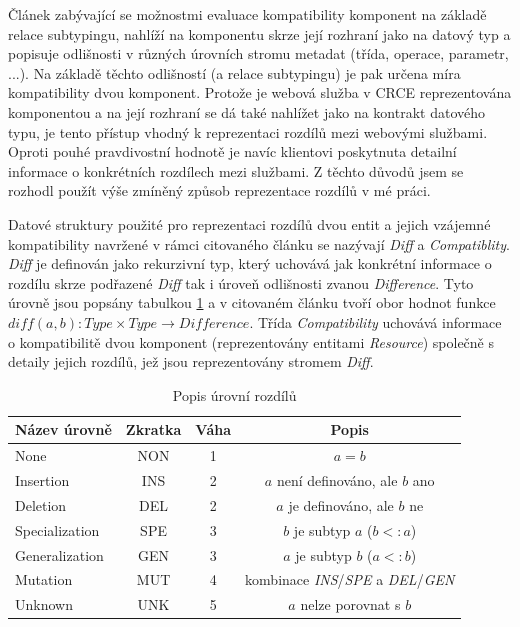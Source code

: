 \documentclass[czech,DP]{thesiskiv}
\begin{document}
Článek \cite{brada2006diff} zabývající se možnostmi evaluace kompatibility komponent na základě relace subtypingu, nahlíží na komponentu skrze její rozhraní jako na datový typ a popisuje odlišnosti v různých úrovních stromu metadat (třída, operace, parametr, ...). Na základě těchto odlišností (a relace subtypingu) je pak určena míra kompatibility dvou komponent. Protože je webová služba v CRCE reprezentována komponentou a na její rozhraní se dá také nahlížet jako na kontrakt datového typu, je tento přístup vhodný k reprezentaci rozdílů mezi webovými službami. Oproti pouhé pravdivostní hodnotě je navíc klientovi poskytnuta detailní informace o konkrétních rozdílech mezi službami. Z těchto důvodů jsem se rozhodl použít výše zmíněný způsob reprezentace rozdílů v mé práci. 

Datové struktury použité pro reprezentaci rozdílů dvou entit a jejich vzájemné kompatibility navržené v rámci citovaného článku se nazývají \textit{Diff} a \textit{Compatiblity}. \textit{Diff} je definován jako rekurzivní typ, který uchovává jak konkrétní informace o rozdílu skrze podřazené \textit{Diff} tak i úroveň odlišnosti zvanou \textit{Difference}. Tyto úrovně jsou popsány tabulkou \ref{tab:diffs} a v citovaném článku tvoří obor hodnot funkce $diff(a,b): Type \times Type \rightarrow Difference$. Třída \textit{Compatibility} uchovává informace o kompatibilitě dvou komponent (reprezentovány entitami \textit{Resource}) společně s detaily jejich rozdílů, jež jsou reprezentovány stromem \textit{Diff}.

\begin{table}[h]
	\centering
	\begin{tabular}{|l|c|c|c|}
		\hline
		Název úrovně & Zkratka & Váha & Popis \\
		\hline
		\hline
		None & NON & 1 & $a = b$ \\
		\hline
		Insertion & INS & 2 & $a$ není definováno, ale $b$ ano \\
		\hline
		Deletion & DEL & 2 & $a$ je definováno, ale $b$ ne \\
		\hline
		Specialization & SPE & 3 & $b$ je subtyp $a$ ($b <: a$) \\
		\hline
		Generalization & GEN & 3& $a$ je subtyp $b$ ($a <: b$) \\
		\hline
		Mutation & MUT & 4 & kombinace \textit{INS}/\textit{SPE} a \textit{DEL}/\textit{GEN} \\
		\hline
		Unknown & UNK & 5 & $a$ nelze porovnat s $b$ \\
		\hline
	\end{tabular}
	\caption{Popis úrovní rozdílů}
	\label{tab:diffs}
\end{table} 
\end{document}
